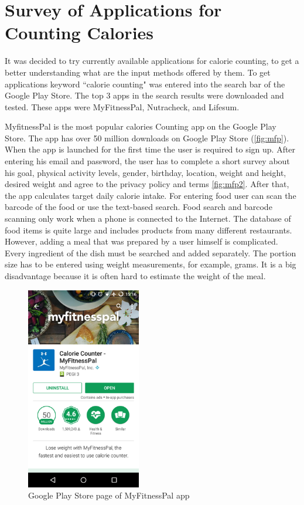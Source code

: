 \section{Survey of Applications for Counting Calories}

 It was decided to try currently available applications for  calorie counting, to get a better understanding what are the input methods offered by them. To get  applications keyword ``calorie counting" was entered into the search bar of the Google Play Store. The top 3 apps in the search results were downloaded and tested. These apps were MyFitnessPal, Nutracheck, and Lifesum.

MyfitnessPal is the most popular calories Counting app on the Google Play Store. The app has over 50 million downloads on Google Play Store (\autoref{fig:mfp}). When the app is launched for the first time the user is required to sign up. After entering his email and password, the user has to complete a short survey about his goal, physical activity levels, gender, birthday, location, weight and height, desired weight and agree to the privacy policy and terms \autoref{fig:mfp2}. After that, the app calculates target daily calorie intake. For entering food user can scan the barcode of the food or use the text-based search. Food search and barcode scanning only work when a phone is connected to the Internet.  The database of food items is quite large and includes products from many different restaurants. However,  adding a meal that was prepared by a user himself is complicated. Every ingredient of the dish must be searched and added separately.  The portion size has to be entered using weight measurements, for example,  grams. It is a big disadvantage because  it is often hard to estimate the weight of the meal.
 
\begin{figure}[ht]
\centering
\includegraphics[width=5cm,scale=0.5]{Figures/2/mfp1.png}
\caption{Google Play Store page of MyFitnessPal app}
\label{fig:mfp}
\end{figure}

